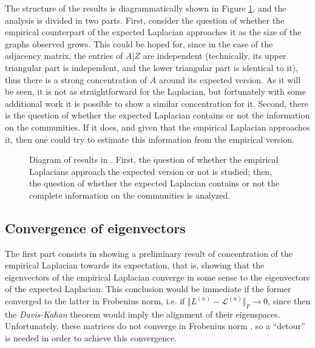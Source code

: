 \documentclass[../../main.tex]{subfiles} %
\begin{document}
	The structure of the results is diagrammatically shown in Figure 
	\ref{fig:tikz-diagram-rohe}, and the analysis is divided in two parts. First, 
	consider the question of whether the empirical counterpart of the expected 
	Laplacian approaches it as the size of the graphs observed grows. This could 
	be hoped for, since in the case of the adjacency matrix, the entries of \(A 
	\vert Z\) are independent (technically, its upper triangular part is 
	independent, and the lower triangular part is identical to it), thus there is a 
	strong concentration of \(A\) around its expected version. As it will be seen, 
	it is not as straightforward for the Laplacian, but fortunately with some 
	additional work it is possible to show a similar concentration for it. Second, 
	there is the question of whether the expected Laplacian contains or not the 
	information on the communities. If it does, and given that the empirical 
	Laplacian approaches it, then one could try to estimate this information from 
	the empirical version.
	\begin{figure}
		\caption{Diagram of results in \cite{rohe_spectral_2011}. First, the 
		question of whether the empirical Laplacians approach the expected 
		version or not is studied; then, the question of whether the expected 
		Laplacian contains or not the complete information on the communities is 
		analyzed.}
		\label{fig:tikz-diagram-rohe}
	\end{figure}	
	
	\subsection{Convergence of eigenvectors}  %
	The first part consists in showing a 
	preliminary result of concentration of 
	the 
	empirical Laplacian towards its expectation, that is, showing that the 
	eigenvectors of the empirical Laplacian converge in some sense to the 
	eigenvectors of the expected Laplacian. This conclusion would be immediate 
	if 
	the former converged to the latter in Frobenius norm, i.e. if \(\Vert L^{(n)} - 
	\mathscr L^{(n)} \Vert_F \to 0\), since then the \textit{Davis-Kahan} theorem 
	\cite{davis-kahan} would imply the alignment of their eigenspaces. 
	Unfortunately, these matrices do 
	not converge in Frobenius norm \cite{rohe_spectral_2011}, so a ``detour'' is 
	needed in order to achieve this 
	convergence. 
	
\end{document}
